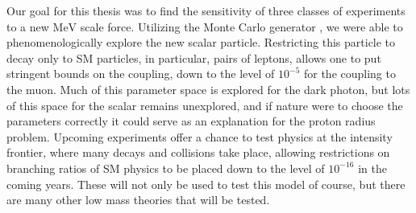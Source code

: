 \label{chapter:conclusion}

Our goal for this thesis was to find the sensitivity of three classes of experiments to a new $\textrm{MeV}$ scale force.
Utilizing the Monte Carlo generator \madgraph, we were able to phenomenologically explore the new scalar particle.
Restricting this particle to decay only to SM particles, in particular, pairs of leptons, allows one to put stringent bounds on the coupling, down to the level of $10^{-5}$ for the coupling to the muon.
Much of this parameter space is explored for the dark photon, but lots of this space for the scalar remains unexplored, and if nature were to choose the parameters correctly it could serve as an explanation for the proton radius problem.
Upcoming experiments offer a chance to test physics at the intensity frontier, where many decays and collisions take place, allowing restrictions on branching ratios of SM physics to be placed down to the level of $10^{-16}$ in the coming years.
These will not only be used to test this model of course, but there are many other low mass theories that will be tested.
